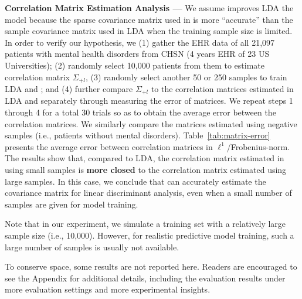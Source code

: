 


\textbf{Correlation Matrix Estimation Analysis --- } We assume \TheName{} improves LDA the model because the sparse covariance matrix used in \TheName{} is more ``accurate'' than the sample covariance matrix used in LDA when the training sample size is limited. 
In order to verify our hypothesis, we (1) gather the EHR data of all 21,097 patients with mental health disorders from CHSN (4 years EHR of 23 US Universities); (2) randomly select 10,000 patients from them to estimate correlation matrix $\Sigma_{+l}$, (3) randomly select another 50 or 250 samples to train LDA and \TheName{}; and (4) further compare $\Sigma_{+l}$ to the correlation matrices estimated in LDA and \TheName{} separately through measuring the error of matrices. 
We repeat steps 1 through 4 for a total 30 trials so as to obtain the average error between the correlation matrices. 
We similarly compare the matrices estimated using negative samples (i.e., patients without mental disorders).
Table~\ref{tab:matrix-error} presents the average error between correlation matrices in $\ell^1$/Frobenius-norm. 
%
The results show that, compared to LDA, the correlation matrix estimated in \TheName{} using small samples is \textbf{more closed} to the correlation matrix estimated using large samples. 
In this case, we conclude that \TheName{} can accurately estimate the covariance matrix for linear discriminant analysis, even when a small number of samples are given for model training. 

Note that in our experiment, we simulate a training set with a relatively large sample size (i.e., 10,000). 
However, for realistic predictive model training, such a large number of samples is usually not available.


To conserve space, some results are not reported here. 
Readers are encouraged to see the Appendix for additional details, including the evaluation results under more evaluation settings and more experimental insights.
